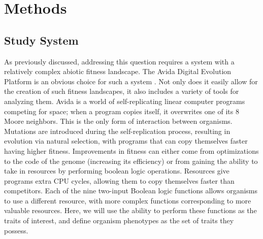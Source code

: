 \section{Methods}

\subsection{Study System}
As previously discussed, addressing this question requires a system with a relatively complex abiotic fitness landscape. The Avida Digital Evolution Platform is an obvious choice for such a system \citep{ofria_avida:_2004}. Not only does it easily allow for the creation of such fitness landscapes, it also includes a variety of tools for analyzing them. Avida is a world of self-replicating linear computer programs competing for space; when a program copies itself, it overwrites one of its 8 Moore neighbors. This is the only form of interaction between organisms. Mutations are introduced during the self-replication process, resulting in evolution via natural selection, with programs that can copy themselves faster having higher fitness. Improvements in fitness can either come from optimizations to the code of the genome (increasing its efficiency) or from gaining the ability to take in resources by performing boolean logic operations. Resources give programs extra CPU cycles, allowing them to copy themselves faster than competitors. Each of the nine two-input Boolean logic functions allows organisms to use a different resource, with more complex functions corresponding to more valuable resources. Here, we will use the ability to perform these functions as the traits of interest, and define organism phenotypes as the set of traits they possess.

